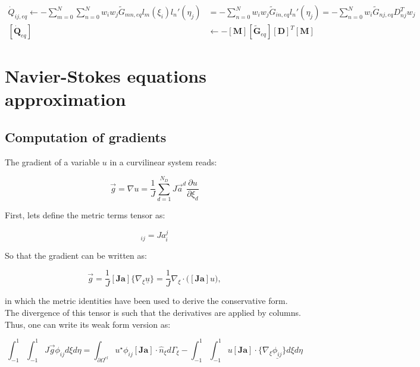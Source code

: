 \documentclass[10pt,a4paper]{article}
\begin{document}
\begin{equation}
\begin{split}
\dot{Q}_{ij,eq} \leftarrow -\sum_{m=0}^N \sum_{n=0}^N	 w_i w_j \tilde{G}_{mn,eq}l_m(\xi_i)l_n'(\eta_j) &= -\sum_{n=0}^N	 w_i w_j \tilde{G}_{in,eq}l_n'(\eta_j) =  -\sum_{n=0}^N w_i \tilde{G}_{nj,eq} D_{nj}^T w_j  \\
[\dot{\boldsymbol{Q}}_{eq}] &\leftarrow -[\boldsymbol{M}] [\boldsymbol{\tilde{G}}_{eq}] [\boldsymbol{D}]^T [\boldsymbol{M}]
\end{split}
\end{equation}


\section{Navier-Stokes equations approximation}

\subsection{Computation of gradients}

The gradient of a variable $u$ in a curvilinear system reads:

\begin{equation}
\vec{g} = \nabla u = \frac{1}{J}\sum_{d=1}^{N_D} J\vec{a}^d \frac{\partial u}{\partial \xi_d}	
\end{equation}

First, lets define the metric terms tensor as:

\begin{equation}
[\boldsymbol{Ja}]_{ij} = Ja_i^j	
\end{equation}

So that the gradient can be written as:

\begin{equation}
\vec{g} = \frac{1}{J}[\boldsymbol{Ja}]\{\nabla_\xi \underline{u}\} = \frac{1}{J}\nabla_\xi \cdot \bigl([\boldsymbol{Ja}]u	\bigr),
\end{equation}

in which the metric identities have been used to derive the conservative form. The divergence of this tensor is such that the derivatives are applied by columns. Thus, one can write its weak form version as:

\begin{equation}
\int_{-1}^{1}\int_{-1}^{1} J \vec{g}\phi_{ij}d\xi d\eta	= \int_{\partial \Omega^{el}}u^\star \phi_{ij} [\boldsymbol{Ja}]\cdot \hat{n}_\xi d\Gamma_\xi -\int_{-1}^{1}\int_{-1}^{1} u [\boldsymbol{Ja}] \cdot \{\nabla_\xi \underline{\phi_{ij}}\}d\xi d\eta	
\end{equation}
\end{document}
